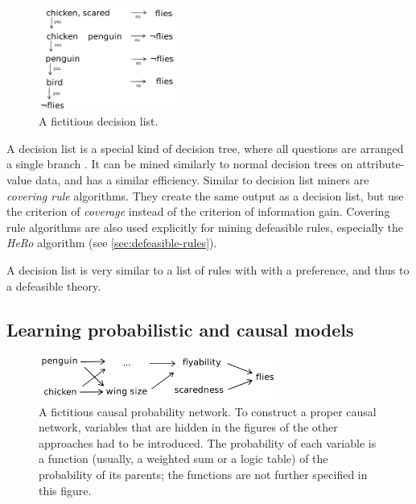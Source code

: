 \begin{figure}[htb]
        \centering
        \includegraphics[width=0.4\textwidth]{images/decision-list.png}
        \caption{A fictitious decision list.}
        \label{fig:decision-list}
\end{figure}

A decision list is a special kind of decision tree, where all questions are arranged a single branch \cite[ch.~18.5.1]{russellArtificialIntelligenceModern2010}. It can be mined similarly to normal decision trees on attribute-value data, and has a similar efficiency. Similar to decision list miners are \textit{covering rule} algorithms. They create the same output as a decision list, but use the criterion of \textit{coverage} instead of the criterion of information gain. Covering rule algorithms are also used explicitly for mining defeasible rules, especially the \textit{HeRo} algorithm (see \autoref{sec:defeasible-rules}). 

A decision list is very similar to a list of rules with with a preference, and thus to a defeasible theory. %

\subsection{Learning probabilistic and causal models}

\begin{figure}[htb]
        \centering
        \includegraphics[width=0.7\textwidth]{images/causal-net.png}
        \caption{A fictitious causal probability network. To construct a proper causal network, variables that are hidden in the figures of the other approaches had to be introduced. The probability of each variable is a function (usually, a weighted sum or a logic table) of the probability of its parents; the functions are not further specified in this figure.}
        \label{fig:causal-network}
\end{figure}

